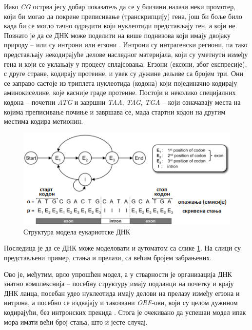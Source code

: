 \documentclass[12pt,oneside]{memoir}
\begin{document}
\begin{CJK}{UTF8}{ipxm}
Иако \textit{CG} острва јесу добар показатељ да се у близини налази неки промотер, који би могао да покрене преписивање (транскрипцију) гена, још би боље било када би се могло тачно одредити који нуклеотиди представљају ген, а који не. Познато је да се ДНК може поделити на више поднизова који имају двојаку природу -- или су интрони или егзони \cite{knapp2007, yoon2009}. Интрони су интрагенски региони, па тако представљају некодирајуће делове наследног материјала, који су уметнути између гена и који се уклањају у процесу сплајсовања. Егзони (ексони, због експресије), с друге стране, кодирају протеине, и увек су дужине дељиве са бројем три. Они се заправо састоје из триплета нуклеотида (кодона) који појединачно кодирају аминокиселине, које касније граде протеине. Постоји и неколико специјалних кодона -- почетни \textit{ATG} и завршни \textit{TAA}, \textit{TAG}, \textit{TGA} -- који означавају места на којима преписивање почиње и завршава се, мада стартни кодон на другим местима кодира метионин.

\begin{figure}[H]
  \centering
  \includegraphics[width=.85\textwidth]{eukariote.png}
  \caption[]{Структура модела еукариотске ДНК\footnotemark}
  \label{fig:eukariote}
\end{figure}


Последица је да се ДНК може моделовати и аутоматом са слике \ref{fig:eukariote}. На слици су представљени пример, стања и прелази, са већим бројем забрањених.

Ово је, међутим, врло упрошћен модел, а у стварности је организација ДНК знатно комплекснија -- посебну структуру имају подланци на почетку и крају ДНК ланца, посебан удео нуклеотида имају делови на прелазу између егзона и интрона, а посебно се издвајају и такозвани \textit{ORF}-ови, који су целом дужином кодирајући, без интронских прекида \cite{henderson1997}. Стога је очекивано да успешан модел ипак мора имати већи број стања, што и јесте случај.


\end{CJK}
\end{document}
